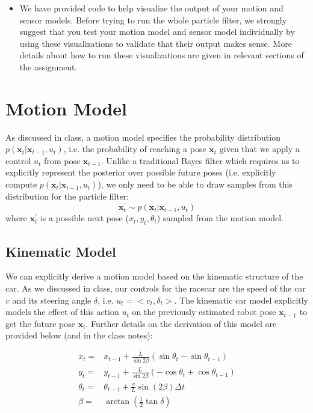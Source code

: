 \documentclass[final]{article}
\begin{document}
\begin{itemize}
\item We have provided code to help visualize the output of your motion and sensor models. Before trying to run the whole particle filter, we strongly suggest that you test your motion model and sensor model individually by using these visualizations to validate that their output makes sense. More details about how to run these visualizations are given in relevant sections of the assignment.

\end{itemize}

\section{ Motion Model}
As discussed in class, a motion model specifies the probability distribution $p(\mathbf{x}_t | \mathbf{x}_{t-1}, u_t)$, i.e. the probability of reaching a pose $\mathbf{x}_t$ given that we apply a control $u_t$ from pose $\mathbf{x}_{t-1}$. Unlike a traditional Bayes filter which requires us to explicitly represent the posterior over possible future poses (i.e. explicitly compute $p(\mathbf{x}_t | \mathbf{x}_{t-1}, u_t)$),  we only need to be able to draw samples from this distribution for the particle filter:
\begin{equation}
\mathbf{x}^\prime_t \sim p(\mathbf{x}_t | \mathbf{x}_{t-1}, u_t) 
\end{equation}
where $\mathbf{x}^\prime_t$ is a possible next pose ($x_t,y_t,\theta_t$) sampled from the motion model.

\subsection{Kinematic Model}
We can explicitly derive a motion model based on the kinematic structure of the car. As we discussed in class, our controls for the racecar are the speed of the car $v$ and its steering angle $\delta$, i.e. $u_t = <v_t, \delta_t>$. The kinematic car model explicitly models the effect of this action $u_t$ on the previously estimated robot pose $\mathbf{x}_{t-1}$ to get the future pose $\mathbf{x}_t$. Further details on the derivation of this model are provided below (and in the class notes):


\begin{align*}
x_t =& x_{t-1} + \frac{L}{\sin{2\beta}}(\sin{\theta_t} - \sin{\theta_{t-1}}) \\
y_t =& y_{t-1} + \frac{L}{\sin{2\beta}}(-\cos{\theta_t} + \cos{\theta_{t-1}}) \\
\theta_t =& \theta_{t-1} + \frac{v}{L}\sin{(2\beta)} \Delta t \\
\beta =& \arctan( \frac{1}{2}\tan{\delta}) \\
\end{align*}
\end{document}

